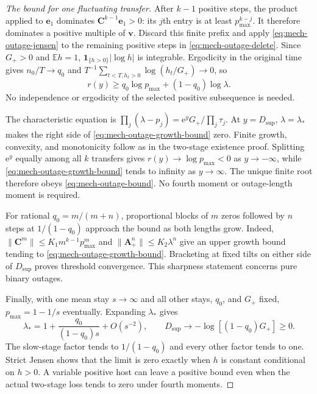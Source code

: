 \begin{proof}[The bound for one fluctuating transfer]
After \(k-1\) positive steps, the product applied to \(\mathbf e_1\) dominates \(\mathbf C^{k-1}\mathbf e_1>0\): its \(j\)th entry is at least \(p_{\max}^{k-j}\). It therefore dominates a positive multiple of \(\mathbf v\). Discard this finite prefix and apply \eqref{eq:mech-outage-jensen} to the remaining positive steps in \eqref{eq:mech-outage-delete}. Since \(G_+>0\) and \(\mathbb E h=1\), \(\mathbf1_{\{h>0\}}|\log h|\) is integrable. Ergodicity in the original time gives
\(n_0/T\to q_0\) and
\(T^{-1}\sum_{t<T,h_t>0}\log(h_t/G_+)\to0\), so
\begin{equation}\label{eq:mech-outage-growth-bound}
 r(y)\geq q_0\log p_{\max}+(1-q_0)\log\lambda.
\end{equation}
No independence or ergodicity of the selected positive subsequence is needed.

The characteristic equation is
\(\prod_j(\lambda-p_j)=\mathrm e^yG_+/\prod_j\tau_j\).
At \(y=D_{\mathrm{sup}}\), \(\lambda=\lambda_*\) makes the right side of \eqref{eq:mech-outage-growth-bound} zero. Finite growth, convexity, and monotonicity follow as in the two-stage existence proof. Splitting \(\mathrm e^y\) equally among all \(k\) transfers gives \(r(y)\to\log p_{\max}<0\) as \(y\to-\infty\), while \eqref{eq:mech-outage-growth-bound} tends to infinity as \(y\to\infty\). The unique finite root therefore obeys \eqref{eq:mech-outage-bound}. No fourth moment or outage-length moment is required.

For rational \(q_0=m/(m+n)\), proportional blocks of \(m\) zeros followed by \(n\) steps at \(1/(1-q_0)\) approach the bound as both lengths grow. Indeed, \(\|\mathbf C^m\|\leq K_1m^{k-1}p_{\max}^m\) and \(\|\mathbf A_+^n\|\leq K_2\lambda^n\) give an upper growth bound tending to \eqref{eq:mech-outage-growth-bound}. Bracketing at fixed tilts on either side of \(D_{\mathrm{sup}}\) proves threshold convergence. This sharpness statement concerns pure binary outages.

Finally, with one mean stay \(s\to\infty\) and all other stays, \(q_0\), and \(G_+\) fixed, \(p_{\max}=1-1/s\) eventually. Expanding \(\lambda_*\) gives
\begin{equation}\label{eq:mech-outage-bound-limit}
 \lambda_*=1+\frac{q_0}{(1-q_0)s}+O(s^{-2}),\qquad
 D_{\mathrm{sup}}\longrightarrow-\log[(1-q_0)G_+]\geq0.
\end{equation}
The slow-stage factor tends to \(1/(1-q_0)\) and every other factor tends to one. Strict Jensen shows that the limit is zero exactly when \(h\) is constant conditional on \(h>0\). A variable positive host can leave a positive bound even when the actual two-stage loss tends to zero under fourth moments.
\end{proof}


